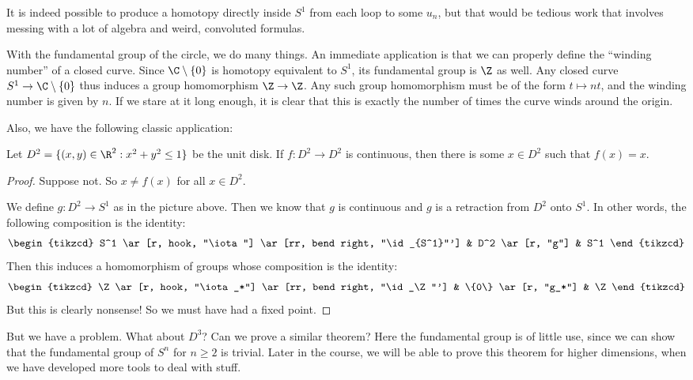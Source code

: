 \documentclass[a4paper]{article}
\begin{document}
It is indeed possible to produce a homotopy directly inside $S^1$ from each loop to some $u_n$, but that would be tedious work that involves messing with a lot of algebra and weird, convoluted formulas.

With the fundamental group of the circle, we do many things. An immediate application is that we can properly define the ``winding number'' of a closed curve. Since $\C \setminus \{0\}$ is homotopy equivalent to $S^1$, its fundamental group is $\Z$ as well. Any closed curve $S^1 \to \C \setminus \{0\}$ thus induces a group homomorphism $\Z \to \Z$. Any such group homomorphism must be of the form $t \mapsto nt$, and the winding number is given by $n$. If we stare at it long enough, it is clear that this is exactly the number of times the curve winds around the origin.

Also, we have the following classic application:
\begin{thm}
  Let $D^2 = \{(x, y) \in \R^2: x^2 + y^2 \leq 1\}$ be the unit disk. If $f: D^2 \to D^2$ is continuous, then there is some $x\in D^2$ such that $f(x) = x$.
\end{thm}

\begin{proof}
  Suppose not. So $x \not= f(x)$ for all $x\in D^2$.
  \begin{center}
  \end{center}
  We define $g: D^2 \to S^1$ as in the picture above. Then we know that $g$ is continuous and $g$ is a retraction from $D^2$ onto $S^1$. In other words, the following composition is the identity:
  \[
    \begin{tikzcd}
      S^1 \ar[r, hook, "\iota"] \ar[rr, bend right, "\id_{S^1}"'] & D^2 \ar[r, "g"] & S^1
    \end{tikzcd}
  \]
  Then this induces a homomorphism of groups whose composition is the identity:
  \[
    \begin{tikzcd}
      \Z \ar[r, hook, "\iota_*"] \ar[rr, bend right, "\id_\Z"'] & \{0\} \ar[r, "g_*"] & \Z
    \end{tikzcd}
  \]
  But this is clearly nonsense! So we must have had a fixed point.
\end{proof}
But we have a problem. What about $D^3$? Can we prove a similar theorem? Here the fundamental group is of little use, since we can show that the fundamental group of $S^n$ for $n \geq 2$ is trivial. Later in the course, we will be able to prove this theorem for higher dimensions, when we have developed more tools to deal with stuff.
\end{document}
